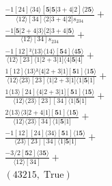 \documentclass[varwidth, border=5pt]{standalone}
\begin{document}
\begin{my}
$\begin{gathered}
\scriptscriptstyle\frac{-1[24]⟨34⟩[𝟓|𝟓|3+4|2]⟨2𝟓⟩}{⟨12⟩[34]⟨2|3+4|2]s_{234}} +\\
\scriptscriptstyle\frac{-1[𝟓|2+4|3⟩[2|3+4|𝟓⟩}{⟨12⟩[34]s_{234}} +\\
\scriptscriptstyle\frac{-1[12]²⟨13⟩⟨14⟩[𝟓4]⟨4𝟓⟩}{⟨12⟩[23]⟨1|2+3|1]⟨4|𝟓|4]} +\\
\scriptscriptstyle\frac{1[12]⟨13⟩²⟨4|2+3|1][𝟓1]⟨1𝟓⟩}{⟨12⟩⟨23⟩[23]⟨1|2+3|1]⟨1|𝟓|1]} +\\
\scriptscriptstyle\frac{1⟨13⟩[24]⟨4|2+3|1][𝟓1]⟨1𝟓⟩}{⟨12⟩⟨23⟩[23][34]⟨1|𝟓|1]} +\\
\scriptscriptstyle\frac{2⟨13⟩⟨3|2+4|1][𝟓1]⟨1𝟓⟩}{⟨12⟩⟨23⟩[34]⟨1|𝟓|1]} +\\
\scriptscriptstyle\frac{-1[12][24]⟨34⟩[𝟓1]⟨1𝟓⟩}{⟨23⟩[23][34]⟨1|𝟓|1]} +\\
\scriptscriptstyle\frac{-3/2[𝟓2]⟨3𝟓⟩}{⟨12⟩[34]} +\\
\scriptscriptstyle(43215,\;\text{True}) \phantom{+}
\end{gathered}$
\end{my}
\end{document}
